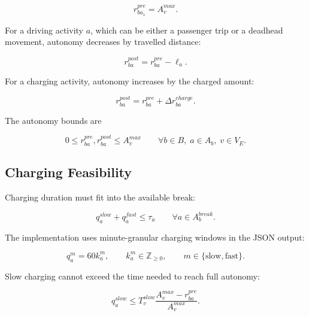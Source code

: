 \begin{equation}
r_{ba_1}^{pre}=A_v^{max}.
\label{eq:battery-initial}
\end{equation}

For a driving activity \(a\), which can be either a passenger trip or a
deadhead movement, autonomy decreases by travelled distance:

\begin{equation}
r_{ba}^{post}
=
r_{ba}^{pre}
-
\ell_a.
\label{eq:battery-drive}
\end{equation}

For a charging activity, autonomy increases by the charged amount:

\begin{equation}
r_{ba}^{post}
=
r_{ba}^{pre}
+
\Delta r_{ba}^{charge}.
\label{eq:battery-charge}
\end{equation}

The autonomy bounds are

\begin{equation}
0
\le
r_{ba}^{pre},r_{ba}^{post}
\le
A_v^{max}
\qquad
\forall b\in B,\;a\in A_b,\;v\in V_E.
\label{eq:battery-bounds}
\end{equation}

\subsection{Charging Feasibility}

Charging duration must fit into the available break:

\begin{equation}
q_a^{slow}+q_a^{fast}\le \tau_a
\qquad
\forall a\in A_b^{break}.
\label{eq:charge-within-break}
\end{equation}

The implementation uses minute-granular charging windows in the JSON output:

\begin{equation}
q_a^m=60k_a^m,
\qquad
k_a^m\in\mathbb{Z}_{\ge0},
\qquad
m\in\{\mathrm{slow},\mathrm{fast}\}.
\label{eq:minute-granularity}
\end{equation}

Slow charging cannot exceed the time needed to reach full autonomy:

\begin{equation}
q_a^{slow}
\le
T_v^{slow}
\frac{A_v^{max}-r_{ba}^{pre}}{A_v^{max}}.
\label{eq:charge-upper-slow}
\end{equation}

